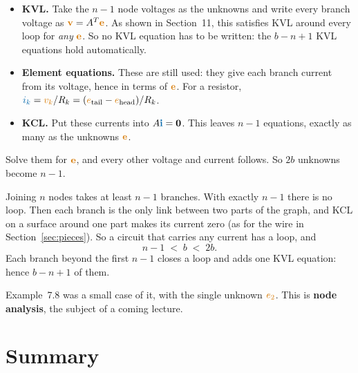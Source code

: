 \documentclass[11pt,a4paper]{article}
\newcommand{\Icol}[1]{\textcolor{ccur}{#1}}
\newcommand{\Vcol}[1]{\textcolor{cvolt}{#1}}
\begin{document}
\begin{itemize}
  \item \textbf{KVL.} Take the $n-1$ node voltages as the unknowns and write every branch
        voltage as $\Vcol{\mathbf{v}} = A^T\Vcol{\mathbf{e}}$. As shown in
        Section~11, this satisfies KVL around every loop for \emph{any} $\Vcol{\mathbf{e}}$.
        So no KVL equation has to be written: the $b-n+1$ KVL equations hold
        automatically.
  \item \textbf{Element equations.} These are still used: they give each branch current from
        its voltage, hence in terms of $\Vcol{\mathbf{e}}$. For a resistor,
        $\Icol{i_k} = \Vcol{v_k}/R_k = (\Vcol{e}_{\text{tail}} - \Vcol{e}_{\text{head}})/R_k$.
  \item \textbf{KCL.} Put these currents into $A\Icol{\mathbf{i}} = \mathbf{0}$. This leaves
        $n-1$ equations, exactly as many as the unknowns $\Vcol{\mathbf{e}}$.
\end{itemize}
Solve them for $\Vcol{\mathbf{e}}$, and every other voltage and current follows. So $2b$
unknowns become $n-1$.

\begin{ideabox}[Always $b > n - 1$]
Joining $n$ nodes takes at least $n-1$ branches. With exactly $n-1$ there is no loop. Then
each branch is the only link between two parts of the graph, and KCL on a surface around
one part makes its current zero (as for the wire in Section~\ref{sec:pieces}). So a circuit
that carries any current has a loop, and
\[
  n - 1 \;<\; b \;<\; 2b .
\]
Each branch beyond the first $n-1$ closes a loop and adds one KVL equation: hence $b-n+1$
of them.
\end{ideabox}

Example~7.8 was a small case of it, with the single unknown $\Vcol{e_2}$. This is \textbf{node analysis}, the subject of a coming
lecture.

\section*{Summary}
\end{document}
